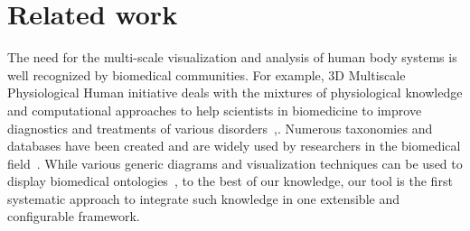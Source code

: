 \section{Related work} \label{sect:relatedWork}                                          %

The need for the multi-scale visualization and analysis of human body systems is well recognized by biomedical communities. For example,
3D Multiscale Physiological Human initiative deals with the mixtures of physiological knowledge and computational approaches to help scientists in biomedicine to improve diagnostics and treatments of various disorders~\cite{MRC09},\cite{Mag09}.
Numerous taxonomies and databases have been created and are widely used by researchers in the biomedical field~\cite{BDB08}.
While various generic diagrams and visualization techniques can be used to display biomedical ontologies~\cite{KHL+07}, to the best of our knowledge, our tool is the first systematic approach to integrate such knowledge in one extensible and configurable framework.

